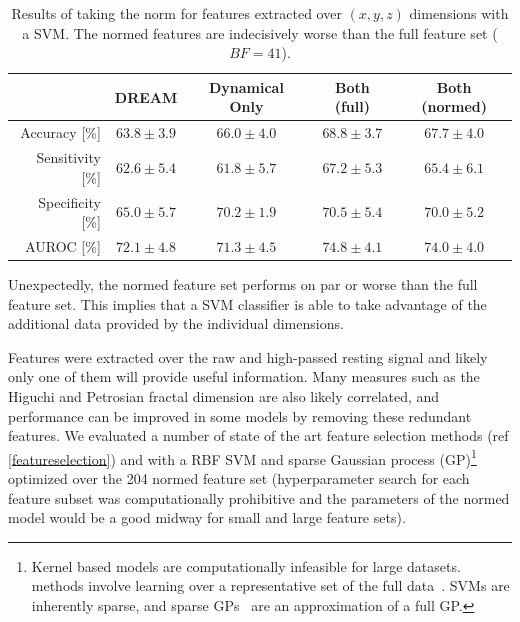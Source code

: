 \documentclass[12pt, twoside]{book}
\renewcommand\emph[1]{\textit{\color{USred}{#1}}}
\begin{document}
\begin{table}[h]
	\caption{Results of taking the norm for features extracted over $(x,y,z)$ dimensions with a SVM. The normed features are indecisively worse than the full feature set ($BF=41$).}
	\label{accelerometernorm}
	\centering
	\begin{tabular}{@{}rcccc@{}}
		&  DREAM & Dynamical Only & Both (full) & Both (normed) \\ \midrule
		Accuracy [\%]    &      $63.8\pm3.9$ &                       $66.0\pm4.0$                                  &     $68.8\pm3.7$
		&						$67.7\pm4.0$\\ \midrule
		Sensitivity [\%] &      $62.6\pm5.4$ &                       $61.8\pm5.7$                                  &     $67.2\pm5.3$
		&					    $65.4\pm6.1$\\ \midrule
		Specificity [\%] &      $65.0\pm5.7$ &                       $70.2\pm1.9$                                  &     $70.5\pm5.4$
		&					    $70.0\pm5.2$\\ \midrule
		AUROC [\%]         &      $72.1\pm4.8$ &                       $71.3\pm4.5$                                  &     $74.8\pm4.1$
		&				 		$74.0\pm4.0$\\ \midrule
	\end{tabular}
\end{table}

Unexpectedly, the normed feature set performs on par or worse than the full feature set. This implies that a SVM classifier is able to take advantage of the additional data provided by the individual dimensions. 


Features were extracted over the raw and high-passed resting signal and likely only one of them will provide useful information. Many measures such as the Higuchi and Petrosian fractal dimension are also likely correlated, and performance can be improved in some models by removing these redundant features. We evaluated a number of state of the art feature selection methods (ref \ref{featureselection}) and with a RBF SVM and sparse Gaussian process (GP)\footnote{Kernel based models are computationally infeasible for large datasets. \emph{Sparse} methods involve learning over a representative set of the full data~\cite{sparsematrix}. SVMs are inherently sparse, and sparse GPs~\cite{sparsegp} are an approximation of a full GP.} optimized over the 204 normed feature set (hyperparameter search for each feature subset was computationally prohibitive and the parameters of the normed model would be a good midway for small and large feature sets).
\end{document}
